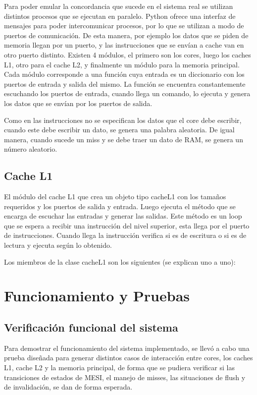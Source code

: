 \documentclass {article}
\begin{document}
Para poder emular la concordancia que sucede en el sistema real se utilizan distintos procesos que se
ejecutan en paralelo. Python ofrece una interfaz de mensajes para poder intercomunicar procesos, por
lo que se utilizan a modo de puertos de comunicación. De esta manera, por ejemplo los datos que se
piden de memoria llegan por un puerto, y las instrucciones que se envían a cache van en otro puerto
distinto. Existen 4 módulos, el primero son los cores, luego los caches L1, otro para el cache L2, y
finalmente un módulo para la memoria principal. Cada módulo corresponde a una función cuya entrada
es un diccionario con los puertos de entrada y salida del mismo. La función se encuentra
constantemente escuchando los puertos de entrada, cuando llega un comando, lo ejecuta y genera los
datos que se envían por los puertos de salida. 

Como en las instrucciones no se especifican los datos que el core debe escribir, cuando este debe
escribir un dato, se genera una palabra aleatoria. De igual manera, cuando sucede un miss y se debe
traer un dato de RAM, se genera un número aleatorio.

\subsection{Cache L1}
El módulo del cache L1 que crea un objeto tipo cacheL1 con los tamaños requeridos y los puertos de
salida y entrada. Luego ejecuta el método que se encarga de escuchar las entradas y generar las
salidas. Este método es un loop que se espera a recibir una instrucción del nivel superior, esta
llega por el puerto de instrucciones. Cuando llega la instrucción verifica si es de escritura o si
es de lectura y ejecuta según lo obtenido.

Los miembros de la clase cacheL1 son los siguientes (se explican uno a uno):
\section{Funcionamiento y Pruebas}
\subsection{Verificación funcional del sistema}
Para demostrar el funcionamiento del sistema implementado, se llevó a cabo una prueba diseñada para
generar distintos casos de interacción entre cores, los caches L1, cache L2 y la memoria principal,
de forma que se pudiera verificar si las transiciones de estados de MESI, el manejo de misses, las
situaciones de flush y de invalidación, se dan de forma esperada. 
\end{document}
